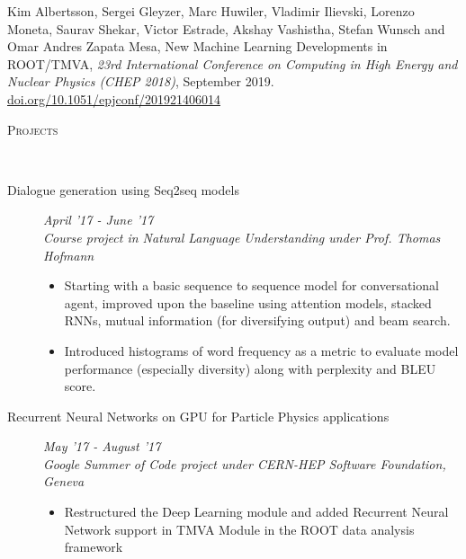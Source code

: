 \documentclass[9pt]{article}
\newenvironment{changemargin}[2]{%
  \begin{list}{}{%
      \setlength{\topsep}{0pt}%
    \setlength{\leftmargin}{#1}%
    \setlength{\rightmargin}{#2}%
    \setlength{\listparindent}{\parindent}%
  \setlength{\itemindent}{\parindent}%
    \setlength{\parsep}{\parskip}%
    }%
  \item[]}{\end{list}
    }
\newcommand{\lineover}{
  \begin{changemargin}{-0.05in}{-0.10in}
    \vspace*{-9pt}
    \hrulefill \\
    \vspace*{-2pt}
  \end{changemargin}
}
\newcommand{\header}[1]{
  \begin{changemargin}{-0.5in}{-0.5in}
    \scshape{#1}\\
        \lineover
  \end{changemargin}
}
\newenvironment{body} {
  \vspace*{-16pt}
        \begin{changemargin}{-0.6in}{-0.65in}
        }	
        {\end{changemargin}
}
\begin{document}
\vspace{1 mm}
Kim Albertsson, Sergei Gleyzer, Marc Huwiler, Vladimir Ilievski, Lorenzo Moneta, Saurav Shekar, Victor Estrade, Akshay Vashistha, Stefan Wunsch and Omar Andres Zapata Mesa, New Machine Learning Developments in ROOT/TMVA, \textit{23rd International Conference on Computing in High Energy and Nuclear Physics (CHEP 2018)}, September 2019.
\href{https://doi.org/10.1051/epjconf/201921406014}{doi.org/10.1051/epjconf/201921406014}
\header{Projects}
\begin{body}
  \vspace{14pt}

  \begin{description}
    \item[\normalsize{Dialogue generation using Seq2seq models}] \hfill \textit{April '17 - June '17} \\
      \textit{Course project in Natural Language Understanding under Prof. Thomas Hofmann}
      \begin{itemize}
        \item Starting with a basic sequence to sequence model for conversational agent, improved upon the baseline using attention models, stacked RNNs, mutual information (for diversifying output) and beam search.
        \item Introduced histograms of word frequency as a metric to evaluate model performance (especially diversity) along with perplexity and BLEU score.
    \end{itemize}

    \item[\normalsize{Recurrent Neural Networks on GPU for Particle Physics applications}] \hfill \textit{May '17 - August '17} \\
      \textit{Google Summer of Code project under CERN-HEP Software Foundation, Geneva}
      \begin{itemize}
        \item Restructured the Deep Learning module and added Recurrent Neural Network
          support in TMVA Module in the ROOT data analysis framework
      \end{itemize}


\end{description}
\end{body}
\end{document}
